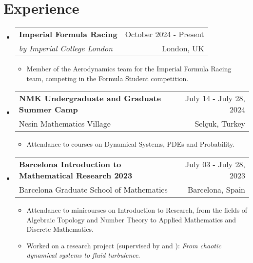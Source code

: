 \documentclass[a4paper,11pt]{article}
\makeatletter
\newcommand{\resumeQuadHeading}[4]{
  \item
  \begin{tabular*}{0.96\textwidth}[t]{l@{\extracolsep{\fill}}r}
    \textbf{#1} & \small #2 \\
    \small#3 & \small #4 \\
  \end{tabular*}
}
\newcommand{\resumeHeadingListStart}{
  \begin{itemize}[leftmargin=0.15in, label={}]
}
\newcommand{\resumeHeadingListEnd}{\end{itemize}}
\makeatother
\begin{document}
\section{Experience}
\resumeHeadingListStart{}
\resumeQuadHeading{Imperial Formula Racing}{October 2024 - Present}{\textit{by Imperial College London}}{London, UK}
\begin{itemize}[leftmargin=3em, itemsep=0.1em, topsep=2pt]
	\item \small Member of the Aerodynamics team for the Imperial Formula Racing team, competing in the Formula Student competition.
\end{itemize}
\resumeHeadingListEnd{}

\resumeHeadingListStart{}
\resumeQuadHeading{NMK Undergraduate and Graduate Summer Camp}{July 14 - July 28, 2024}{Nesin Mathematics Village}{Selçuk, Turkey}
\begin{itemize}[leftmargin=3em, itemsep=0.1em, topsep=2pt]
	\item \small Attendance to courses on Dynamical Systems, PDEs and Probability.
\end{itemize}
\resumeHeadingListEnd{}

\resumeHeadingListStart{}
\resumeQuadHeading{Barcelona Introduction to Mathematical Research 2023}{July 03 - July 28, 2023}{Barcelona Graduate School of Mathematics}{Barcelona, Spain}
\begin{itemize}[leftmargin=3em, itemsep=0.1em, topsep=2pt]
	\item \small Attendance to minicourses on Introduction to Research, from the fields of Algebraic Topology and Number Theory to Applied Mathematics and Discrete Mathematics.
	\item \small Worked on a research project (supervised by \href{https://web.mat.upc.edu/jezabel.curbelo/}{} and \href{https://df.upc.edu/en/instabilities/people/alvaro.meseguer}{}): \emph{From chaotic dynamical systems to fluid turbulence}.
\end{itemize}
\resumeHeadingListEnd{}
\end{document}
